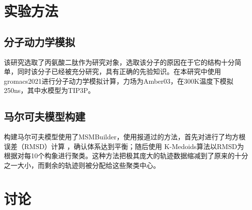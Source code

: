\documentclass[a4paper]{article}
\begin{document}
\begin{CJK}{UTF8}{gbsn}
\section{实验方法}
	\subsection{分子动力学模拟}

该研究选取了丙氨酸二肽作为研究对象，选取该分子的原因在于它的结构十分简单，同时该分子已经被充分研究，具有正确的先验知识。在本研究中使用gromacs2021进行分子动力学模拟计算，力场为Amber03，在300K温度下模拟250ns，其中水模型为TIP3P。

	\subsection{马尔可夫模型构建}
构建马尔可夫模型使用了MSMBuilder，使用报道过的方法，首先对进行了均方根误差（RMSD）计算 ，确认体系达到平衡；随后使用 K-Medoids算法以RMSD为根据对每10个构象进行聚类。这种方法把极其庞大的轨迹数据缩减到了原来的十分之一大小，而剩余的轨迹则被分配给这些聚类中心。


\section{讨论}



\end{CJK}
\end{document}
